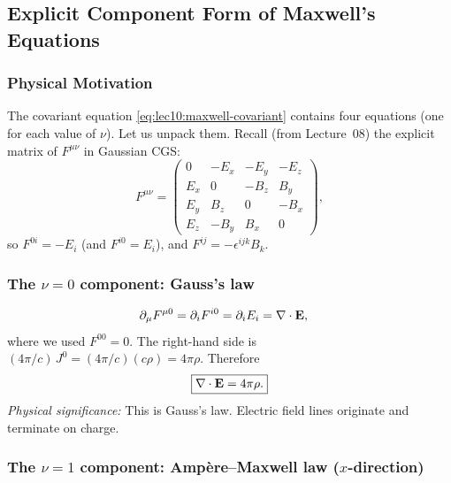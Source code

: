 \subsection{Explicit Component Form of Maxwell's Equations}\label{subsec:lec10-components}

\subsubsection*{Physical Motivation}
The covariant equation \eqref{eq:lec10:maxwell-covariant} contains four equations (one for each value
of $\nu$).  Let us unpack them.  Recall (from Lecture~08) the explicit matrix of $F^{\mu\nu}$ in
Gaussian CGS:
\begin{equation}\label{eq:lec10:F-matrix}
  F^{\mu\nu} =
  \begin{pmatrix}
    0 & -E_x & -E_y & -E_z \\
    E_x & 0 & -B_z & B_y \\
    E_y & B_z & 0 & -B_x \\
    E_z & -B_y & B_x & 0
  \end{pmatrix},
\end{equation}
so $F^{0i}=-E_i$ (and $F^{i0}=E_i$), and $F^{ij}=-\epsilon^{ijk}B_k$.

\subsubsection*{The $\nu=0$ component: Gauss's law}

\begin{align}
  \partial_\mu F^{\mu 0}
  &=
  \partial_i F^{i0}
  =
  \partial_i E_i
  =
  \nabla\cdot\mathbf{E} ,
  \label{eq:lec10:gauss-lhs}
\end{align}
where we used $F^{00}=0$.  The right-hand side is $(4\pi/c)\,J^0 = (4\pi/c)(c\rho)=4\pi\rho$.
Therefore
\begin{equation}\label{eq:lec10:gauss}
  \boxed{
  \nabla\cdot\mathbf{E} = 4\pi\rho .
  }
\end{equation}
\textit{Physical significance:} This is Gauss's law.  Electric field lines originate and terminate on
charge.

\subsubsection*{The $\nu=1$ component: Ampère--Maxwell law ($x$-direction)}

